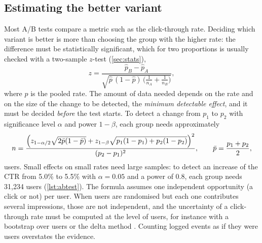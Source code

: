 \subsection{Estimating the better variant}

Most A/B tests compare a metric such as the click-through rate. Deciding which variant is better is more than choosing the group
with the higher rate: the difference must be statistically significant, which for two proportions is usually checked with a
two-sample $z$-test (\cref{sec:stats}),
\begin{equation}
  z=\frac{\hat p_B-\hat p_A}{\sqrt{\hat p\,(1-\hat p)\,\bigl(\frac1{n_A}+\frac1{n_B}\bigr)}},
\end{equation}
where $\hat p$ is the pooled rate. The amount of data needed depends on the rate and on the size of the change to be detected, the
\emph{minimum detectable effect}, and it must be decided \emph{before} the test starts. To detect a change from $p_1$ to $p_2$ with
significance level $\alpha$ and power $1-\beta$, each group needs approximately
\begin{equation}\label{eq:samplesize}
  n=\frac{\Bigl(z_{1-\alpha/2}\sqrt{2\bar p(1-\bar p)}+z_{1-\beta}\sqrt{p_1(1-p_1)+p_2(1-p_2)}\Bigr)^2}{(p_2-p_1)^2},
  \qquad \bar p=\frac{p_1+p_2}{2},
\end{equation}
users. Small effects on small rates need large samples: to detect an increase of the CTR from 5.0\% to 5.5\% with $\alpha=0.05$ and a
power of 0.8, each group needs 31,234 users (\cref{lst:abtest}). The formula assumes one independent opportunity (a click or not) per
user. When users are randomised but each one contributes several impressions, those are not independent, and the
uncertainty of a click-through rate must be computed at the level of users, for instance with a bootstrap over users or
the delta method \citep{deng2018applying}. Counting logged events as if they were users overstates the evidence.

